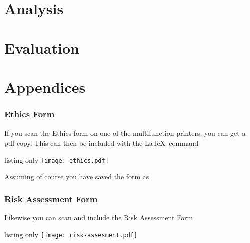 \documentclass[10pt,twoside]{book}
\begin{document}
\frontmatter




\tableofcontents

\mainmatter

\part{Analysis}


\part{Evaluation}


\printbibliography
\part{Appendices}
\appendix


\section{Ethics Form}
If you scan the Ethics form on one of the multifunction printers, you can get a pdf copy.  This can then be included with the \LaTeX\ command
\begin{tcblisting}{listing only}
\texttt{[image: ethics.pdf]}
\end{tcblisting}
Assuming of course you have saved the form  as 

\section{Risk Assessment Form}
Likewise you can scan and include the Risk Assessment Form
\begin{tcblisting}{listing only}
\texttt{[image: risk-assesment.pdf]}
\end{tcblisting}
\end{document}
